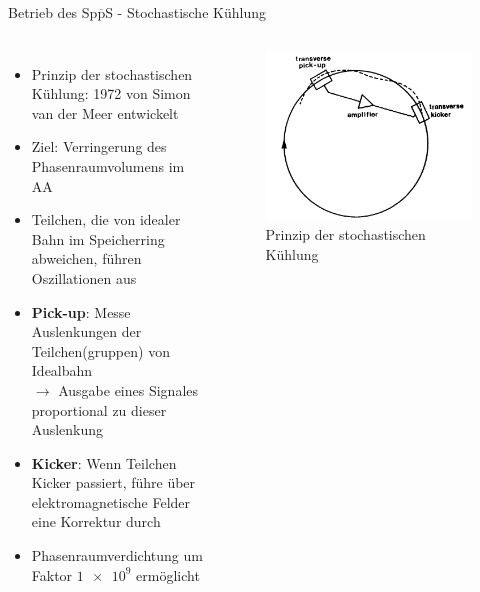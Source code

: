 \documentclass[aspectratio=1610, professionalfonts, 10pt]{beamer}
\begin{document}
\begin{frame}{Betrieb des Sp$\overline{\text{p}}$S - Stochastische Kühlung}
	\begin{columns}
				\begin{itemize}
					\setlength\itemsep{0.5em}
					\item Prinzip der stochastischen Kühlung: 1972 von Simon van der Meer entwickelt
					\item Ziel: Verringerung des Phasenraumvolumens im AA
					\item Teilchen, die von idealer Bahn im Speicherring abweichen, führen Oszillationen aus
					\item \textbf{Pick-up}: Messe Auslenkungen der Teilchen(gruppen) von Idealbahn\\
					$\rightarrow$ Ausgabe eines Signales proportional zu dieser Auslenkung
					\item \textbf{Kicker}: Wenn Teilchen Kicker passiert, führe über elektromagnetische Felder eine Korrektur durch
					\item Phasenraumverdichtung um Faktor $\num{1e9}$ ermöglicht
				\end{itemize}
			\begin{figure}
	  			\centering
				\includegraphics[width=\linewidth]{Images/Screenshot_2018-12-04_12-28-18.png}
				\caption{Prinzip der stochastischen Kühlung \cite{doi:10.1142/9789814644150_0006}}
	  			\label{fig:sad}
			\end{figure}
	\end{columns}
\end{frame}
\end{document}
